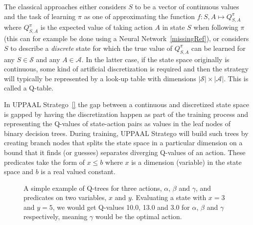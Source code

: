 \documentclass{article}
\begin{document}
The classical approaches either considers $S$ to be a vector of continuous
values and the task of learning $\pi$ as one of approximating the function $f:
S, A \mapsto Q^{\pi}_{S,A}$ where $Q^{\pi}_{S,A}$ is the expected value of
taking action $A$ in state $S$ when following $\pi$ (this can for example be
done using a Neural Network~\ref{missingRef}), or considers $S$ to describe a
\textit{discrete} state for which the true value of $Q^{\pi}_{S,A}$ can be
learned for any $S \in \mathcal{S}$ and any $A \in \mathcal{A}$. In the latter
case, if the state space originally is continuous, some kind of artificial
discretization is required and then the strategy will typically be represented
by a look-up table with dimensions $|\mathcal{S}|\times|\mathcal{A}|$. This is called a Q-table.

In UPPAAL Stratego~\ref{} the gap between a continuous and discretized state
space is gapped by having the discretization happen as part of the training
process and representing the Q-values of state-action pairs as values in the
leaf nodes of binary decision trees. During training, UPPAAL Stratego will build
such trees by creating branch nodes that splits the state space in a particular
dimension on a bound that it finds (or guesses) separates diverging Q-values of
an action. These predicates take the form of $x \le b$ where $x$ is a dimension
(variable) in the state space and $b$ is a real valued constant.

\begin{figure}[ht]
    \centering
        \quad
        \quad

    \caption{%
        A simple example of Q-trees for three actions, $\alpha$, $\beta$ and
        $\gamma$, and predicates on two variables, $x$ and $y$. Evaluating a
        state with $x=3$ and $y=5$, we would get Q-values 10.0, 13.0 and 3.0 for
        $\alpha$, $\beta$ and $\gamma$ respectively, meaning $\gamma$ would be
        the optimal action.
    }\label{fig:qTreeExample}
\end{figure}
\end{document}

